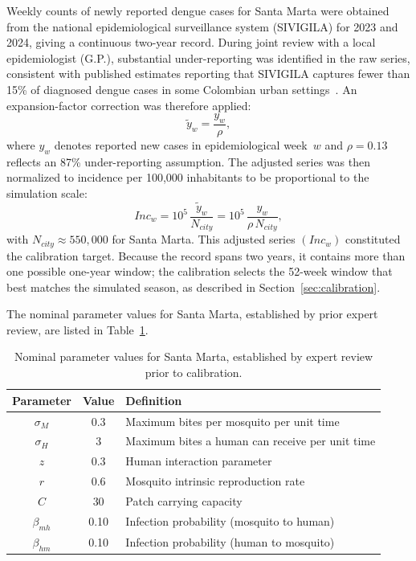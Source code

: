 \documentclass[applsci,article,accept,pdftex,moreauthors]{Definitions/mdpi}
\begin{document}
Weekly counts of newly reported dengue cases for Santa Marta were obtained from the national epidemiological surveillance system (SIVIGILA) for 2023 and 2024, giving a continuous two-year record. During joint review with a local epidemiologist (G.P.), substantial under-reporting was identified in the raw series, consistent with published estimates reporting that SIVIGILA captures fewer than 15\% of diagnosed dengue cases in some Colombian urban settings~\cite{carabali2021dengue}. An expansion-factor correction was therefore applied:
\begin{equation}
\tilde{y}_w = \frac{y_w}{\rho},
\label{eq:expansion}
\end{equation}
where $y_w$ denotes reported new cases in epidemiological week~$w$ and $\rho = 0.13$ reflects an 87\% under-reporting assumption. The adjusted series was then normalized to incidence per 100{,}000 inhabitants to be proportional to the simulation scale:
\begin{equation}
\mathit{Inc}_w = 10^5\,\frac{\tilde{y}_w}{N_{\mathit{city}}} = 10^5\,\frac{y_w}{\rho\,N_{\mathit{city}}},
\label{eq:incidence}
\end{equation}
with $N_{\mathit{city}} \approx 550{,}000$ for Santa Marta. This adjusted series $(\mathit{Inc}_w)$ constituted the calibration target. Because the record spans two years, it contains more than one possible one-year window; the calibration selects the 52-week window that best matches the simulated season, as described in Section~\ref{sec:calibration}.

The nominal parameter values for Santa Marta, established by prior expert review, are listed in Table~\ref{table:params_sm}.

\begin{table}[H]
\centering
\caption{Nominal parameter values for Santa Marta, established by expert review prior to calibration.}
\label{table:params_sm}
\begin{tabular}{ccl}
\toprule
\textbf{Parameter} & \textbf{Value} & \textbf{Definition} \\
\midrule
$\sigma_M$    & 0.3  & Maximum bites per mosquito per unit time \\
$\sigma_H$    & 3    & Maximum bites a human can receive per unit time \\
$z$           & 0.3  & Human interaction parameter \\
$r$           & 0.6  & Mosquito intrinsic reproduction rate \\
$C$           & 30   & Patch carrying capacity \\
$\beta_{mh}$  & 0.10 & Infection probability (mosquito to human) \\
$\beta_{hm}$  & 0.10 & Infection probability (human to mosquito) \\
\bottomrule
\end{tabular}
\end{table}
\end{document}
